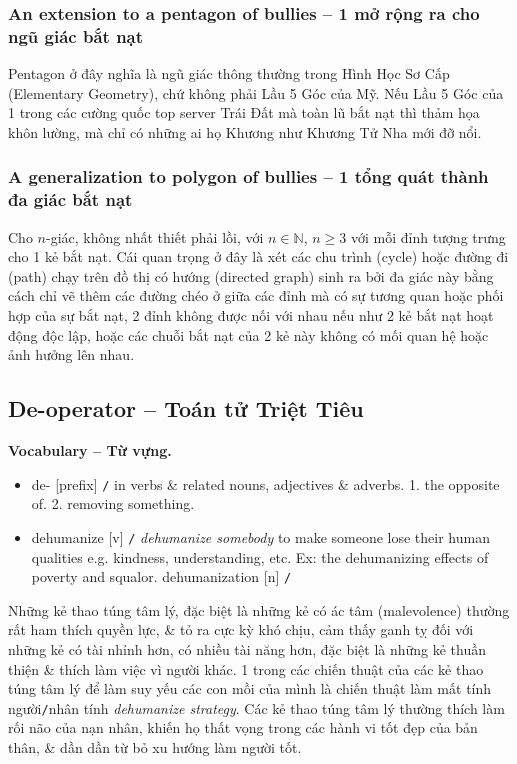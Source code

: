 \documentclass[12pt,oneside]{book}
\begin{document}
\subsubsection{An extension to a pentagon of bullies -- 1 mở rộng ra cho ngũ giác bắt nạt}
Pentagon ở đây nghĩa là ngũ giác thông thường trong Hình Học Sơ Cấp (Elementary Geometry), chứ không phải Lầu 5 Góc của Mỹ. Nếu Lầu 5 Góc của 1 trong các cường quốc top server Trái Đất mà toàn lũ bắt nạt thì thảm họa khôn lường, mà chỉ có những ai họ Khương như {\sc Khương Tử Nha} mới đỡ nổi.

\subsubsection{A generalization to polygon of bullies -- 1 tổng quát thành đa giác bắt nạt}
Cho $n$-giác, không nhất thiết phải lồi, với $n\in\mathbb{N}$, $n\ge3$ với mỗi đỉnh tượng trưng cho 1 kẻ bắt nạt. Cái quan trọng ở đây là xét các chu trình (cycle) hoặc đường đi (path) chạy trên đồ thị có hướng (directed graph) sinh ra bởi đa giác này bằng cách chỉ vẽ thêm các đường chéo ở giữa các đỉnh mà có sự tương quan hoặc phối hợp của sự bắt nạt, 2 đỉnh không được nối với nhau nếu như 2 kẻ bắt nạt hoạt động độc lập, hoặc các chuỗi bắt nạt của 2 kẻ này không có mối quan hệ hoặc ảnh hưởng lên nhau.

\subsection{De-operator -- Toán tử Triệt Tiêu}
\textbf{\textsf{\small Vocabulary -- Từ vựng.}}
\begin{itemize}\small
	\item {\sf de-} [prefix] {\tt/} in verbs \& related nouns, adjectives \& adverbs. 1. the opposite of. 2. removing something.
	\item {\sf dehumanize} [v] {\tt/} {\it dehumanize somebody} to make someone lose their human qualities e.g. kindness, understanding, etc. Ex: the dehumanizing effects of poverty and squalor. {\sf dehumanization} [n] {\tt/}
\end{itemize}
Những kẻ thao túng tâm lý, đặc biệt là những kẻ có ác tâm (malevolence) thường rất ham thích quyền lực, \& tỏ ra cực kỳ khó chịu, cảm thấy ganh tỵ đối với những kẻ có tài nhỉnh hơn, có nhiều tài năng hơn, đặc biệt là những kẻ thuần thiện \& thích làm việc vì người khác. 1 trong các chiến thuật của các kẻ thao túng tâm lý để làm suy yếu các con mồi của mình là chiến thuật làm mất tính người{\tt/}nhân tính {\it dehumanize strategy}. Các kẻ thao túng tâm lý thường thích làm rối não của nạn nhân, khiến họ thất vọng trong các hành vi tốt đẹp của bản thân, \& dần dần từ bỏ xu hướng làm người tốt.
\end{document}

